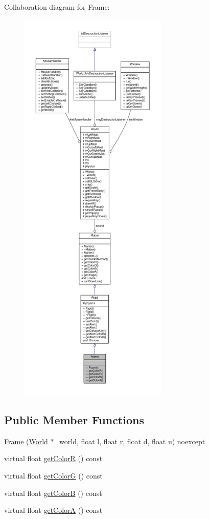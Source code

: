 Collaboration diagram for Frame\+:\nopagebreak
\begin{figure}[H]
\begin{center}
\leavevmode
\includegraphics[height=550pt]{classFrame__coll__graph}
\end{center}
\end{figure}
\subsection*{Public Member Functions}
\begin{DoxyCompactItemize}
\item 
\hyperlink{classFrame_acfe3dc2087b63497a740317623e4d7ff}{Frame} (\hyperlink{classWorld}{World} $\ast$\+\_\+world, float l, float \hyperlink{image_8h_a62969232668331297e2dca1ae2ddd10d}{r}, float d, float u) noexcept
\item 
virtual float \hyperlink{classFrame_a1f5aa3b4dd7b90959a95c1e54f01a1e4}{get\+Color\+R} () const 
\item 
virtual float \hyperlink{classFrame_a44139c9e8bee6504c43bb6bc21b1d599}{get\+Color\+G} () const 
\item 
virtual float \hyperlink{classFrame_aac730f8f9ae5f59cb6a1814d56a8eefa}{get\+Color\+B} () const 
\item 
virtual float \hyperlink{classFrame_a99769eacd74a31fc9d198f83bc6616db}{get\+Color\+A} () const 
\end{DoxyCompactItemize}
